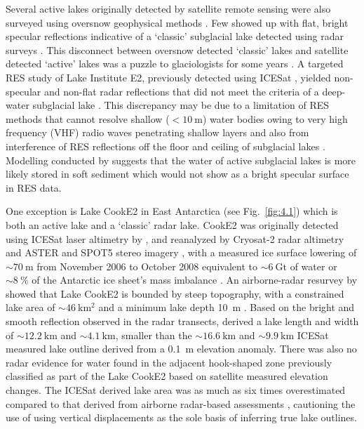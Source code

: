 Several active lakes originally detected by satellite remote sensing were also surveyed using oversnow geophysical methods \citep[e.g.][]{ChristiansonSubglacialLakeWhillans2012,WrightSubglacialhydrologicalconnectivity2014}.
Few showed up with flat, bright specular reflections indicative of a `classic' subglacial lake detected using radar surveys \citep[][]{CarterRadarbasedsubglaciallake2007}.
This disconnect between oversnow detected `classic' lakes and satellite detected `active' lakes was a puzzle to glaciologists for some years \citep{SiegertRecentadvancesunderstanding2016}.
A targeted \gls{RES} study of Lake Institute E2, previously detected using ICESat \citep{Smithinventoryactivesubglacial2009}, yielded non-specular and non-flat radar reflections that did not meet the criteria of a deep-water subglacial lake \citep{SiegertBoundaryconditionsactive2014}.
This discrepancy may be due to a limitation of \gls{RES} methods that cannot resolve shallow ($< \SI{10}{\metre}$) water bodies owing to very high frequency (VHF) radio waves penetrating shallow layers and also from interference of \gls{RES} reflections off the floor and ceiling of subglacial lakes \citep{GormanPenetrationAntarcticsubglacial1999}.
Modelling conducted by \citet{CarterAntarcticsubglaciallakes2017} suggests that the water of active subglacial lakes is more likely stored in soft sediment which would not show as a bright specular surface in \gls{RES} data. %

One exception is Lake CookE2 in East Antarctica (see Fig.~\ref{fig:4.1}) which is both an active lake and a `classic' radar lake.
CookE2 was originally detected using ICESat laser altimetry by \citet{Smithinventoryactivesubglacial2009}, and reanalyzed by Cryosat-2 radar altimetry \citep{McMillanThreedimensionalmappingCryoSat22013} and ASTER and SPOT5 stereo imagery \citep{FlamentCascadingwaterWilkes2014}, with a measured ice surface lowering of $\sim\SI{70}{\metre}$ from November 2006 to October 2008 equivalent to $\sim\SI{6}{\giga\tonne}$ of water or $\sim\SI{8}{\percent}$ of the Antarctic ice sheet's mass imbalance \citep{ShepherdReconciledEstimateIceSheet2012}.
An airborne-radar resurvey by \citet{LiRadarSoundingConfirms2020} showed that Lake CookE2 is bounded by steep topography, with a constrained lake area of $\sim\SI{46}{\kilo\metre\squared}$ and a minimum lake depth \SI{10}{\metre} \citep{GormanPenetrationAntarcticsubglacial1999}.
Based on the bright and smooth reflection observed in the radar transects, \citet{LiRadarSoundingConfirms2020} derived a lake length and width of $\sim\SI{12.2}{\kilo\metre}$ and $\sim\SI{4.1}{\kilo\metre}$, smaller than the $\sim\SI{16.6}{\kilo\metre}$ and $\sim\SI{9.9}{\kilo\metre}$ ICESat measured lake outline \citep{Smithinventoryactivesubglacial2009} derived from a \SI{0.1}{\metre} elevation anomaly.
There was also no radar evidence for water found in the adjacent hook-shaped zone previously classified as part of the Lake CookE2 based on satellite measured elevation changes.
The ICESat derived lake area was as much as six times overestimated compared to that derived from airborne radar-based assessments \citep{LiRadarSoundingConfirms2020}, cautioning the use of using vertical displacements as the sole basis of inferring true lake outlines.

